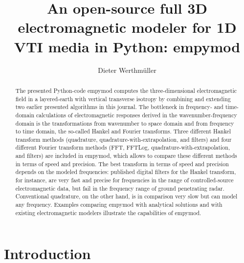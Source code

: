 \documentclass[manuscript,revised]{geophysics}
\begin{document}
\title{An open-source full 3D electromagnetic modeler for 1D VTI media in Python: empymod}

\renewcommand{\thefootnote}{1}%


\address{Instituto Mexicano del Petróleo,
         Eje Central Lázaro Cárdenas Norte 152,
         Col. San Bartolo Atepehuacan C.P. 07730,
         Ciudad de México, México.
         E-mail: \href{mailto:dieter@werthmuller.org}{Dieter@Werthmuller.org}.}

\author{Dieter Werthmüller\footnotemark[1]}

\footer{}

\maketitle

\begin{abstract} %
  The presented Python-code empymod computes the three-dimensional
  electromagnetic field in a layered-earth with vertical transverse isotropy by
  combining and extending two earlier presented algorithms in this journal.
  The bottleneck in frequency- and time-domain calculations of electromagnetic
  responses derived in the wavenumber-frequency domain is the transformations
  from wavenumber to space domain and from frequency to time domain, the
  so-called Hankel and Fourier transforms. Three different Hankel transform
  methods (quadrature, quadrature-with-extrapolation, and filters) and four
  different Fourier transform methods (FFT, FFTLog,
  quadrature-with-extrapolation, and filters) are included in empymod, which
  allows to compare these different methods in terms of speed and precision.
  The best transform in terms of speed and precision depends on the modeled
  frequencies: published digital filters for the Hankel transform, for
  instance, are very fast and precise for frequencies in the range of
  controlled-source electromagnetic data, but fail in the frequency range of
  ground penetrating radar. Conventional quadrature, on the other hand, is in
  comparison very slow but can model any frequency.  Examples comparing empymod
  with analytical solutions and with existing electromagnetic modelers
  illustrate the capabilities of empymod.
\end{abstract}

\section{Introduction}
\end{document}
